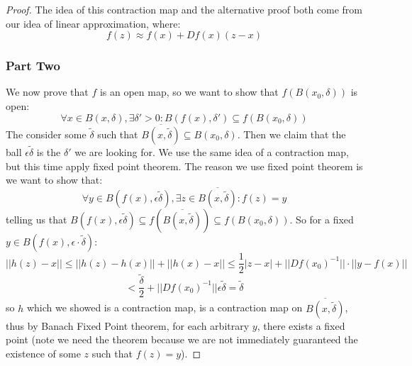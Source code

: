 \documentclass[10pt,letterpaper]{article} %
\begin{document}
\begin{proof}
The idea of this contraction map and the alternative proof both come from our idea of linear approximation, where:
\begin{equation*}
f(z) \approx f(x) + Df(x)(z-x)
\end{equation*}

\subsubsection*{Part Two}

We now prove that $f$ is an open map, so we want to show that $f(B(x_0, \delta))$ is open:
\begin{equation*}
\forall x \in B(x, \delta), \exists \delta' > 0: B(f(x), \delta') \subseteq f(B(x_0, \delta))
\end{equation*}
The consider some $\tilde{\delta}$ such that $\overline{B(x, \tilde{\delta})} \subseteq B(x_0, \delta)$. Then we claim that the ball $\epsilon \tilde{\delta}$ is the $\delta'$ we are looking for. We use the same idea of a contraction map, but this time apply fixed point theorem.
The reason we use fixed point theorem is we want to show that:
\begin{equation*}
\forall y \in B(f(x), \epsilon\tilde{\delta}), \exists z \in \overline{B(x, \tilde{\delta})}: f(z) = y
\end{equation*}
telling us that $B(f(x), \epsilon \tilde{\delta}) \subseteq f(\overline{B(x, \tilde{\delta})}) \subseteq f(B(x_0, \delta))$. So for a fixed $y \in B(f(x), \epsilon \cdot \tilde{\delta})$:
\begin{equation*}
||h(z) - x|| \leqslant ||h(z) - h(x)|| + ||h(x) - x|| \leqslant \frac{1}{2}|z-x| + ||Df(x_0)^{-1}||\cdot||y - f(x)|| 
\end{equation*}
\begin{equation*}
< \frac{\tilde{\delta}}{2} + ||Df(x_0)^{-1}|| \epsilon \tilde{\delta} = \tilde{\delta}
\end{equation*}
so $h$ which we showed is a contraction map, is a contraction map on $\overline{B(x, \tilde{\delta})}$, thus by Banach Fixed Point theorem, for each arbitrary $y$, there exists a fixed point (note we need the theorem because we are not immediately guaranteed the existence of some $z$ such that $f(z) = y$).


\end{proof}
\end{document}
